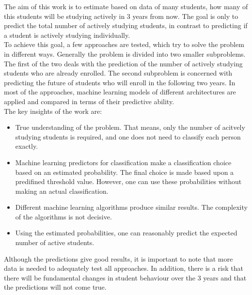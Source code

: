 

The aim of this work is to estimate based on data of many students, how many of this students will be studying
actively in 3 years from now. The goal is only to predict the total number of actively studying students,
in contrast to predicting if a student is actively studying individually. \\

To achieve this goal, a few approaches are tested, which try to solve the problem in different ways.
Generally the problem is divided into two smaller subproblems. The first of the two deals with the prediction of the number of
actively studying students who are already enrolled.
The second subproblem is concerned with predicting the future of students who will enroll in the following two years.
In most of the approaches, machine learning models of different architectures are applied and compared in terms of their predictive ability. \\

The key insights of the work are:
\begin{itemize}
	\item True understanding of the problem. That means, only the number of acitvely studying students
	      is required, and one does not need to classify each person exactly.
	\item Machine learning predictors for classification make a classification choice based on an estimated probability.
	      The final choice is made based upon a predifined threshold value. However, one can use these probabilities without making an
	      actual classification.
	\item Different machine learning algorithms produce similar results. The complexity of the algorithms is not decisive.
	\item Using the estimated probabilities, one can reasonably predict the expected number of active students.
\end{itemize}

Although the predictions give good results, it is important to note that more data is needed to adequately test all approaches.
In addition, there is a risk that there will be fundamental changes in student behaviour over the 3 years and that the predictions
will not come true.